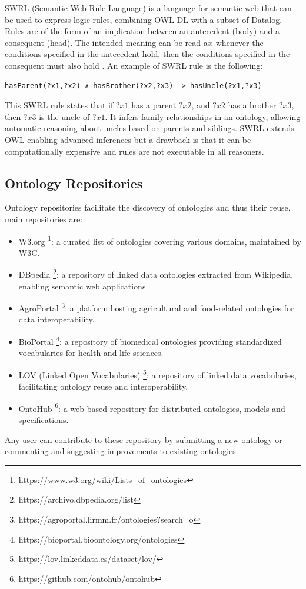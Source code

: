SWRL (Semantic Web Rule Language) is a language for semantic web that can be used to express logic rules, combining OWL DL with a subset of Datalog. Rules are of the form of an implication between an antecedent (body) and a consequent (head). The intended meaning can be read as: whenever the conditions specified in the antecedent hold, then the conditions specified in the consequent must also hold \cite{swrl_wiki}. An example of SWRL rule is the following:
\begin{lstlisting}
hasParent(?x1,?x2) ∧ hasBrother(?x2,?x3) -> hasUncle(?x1,?x3)
\end{lstlisting}
This SWRL rule states that if $?x1$ has a parent $?x2$, and $?x2$ has a brother $?x3$, then $?x3$ is the uncle of $?x1$. It infers family relationships in an ontology, allowing automatic reasoning about uncles based on parents and siblings.
SWRL extends OWL enabling advanced inferences but a drawback is that it can be computationally expensive and rules are not executable in all reasoners.

\subsection{Ontology Repositories}
Ontology repositories facilitate the discovery of ontologies and thus their reuse, main repositories are:
\begin{itemize}
    \item W3.org \footnote{https://www.w3.org/wiki/Lists\_of\_ontologies}: a curated list of ontologies covering various domains, maintained by W3C.

    \item DBpedia \footnote{https://archivo.dbpedia.org/list}: a repository of linked data ontologies extracted from Wikipedia, enabling semantic web applications.

    \item AgroPortal \footnote{https://agroportal.lirmm.fr/ontologies?search=o}: a platform hosting agricultural and food-related ontologies for data interoperability.

    \item BioPortal \footnote{https://bioportal.bioontology.org/ontologies}: a repository of biomedical ontologies providing standardized vocabularies for health and life sciences.

    \item LOV (Linked Open Vocabularies) \footnote{https://lov.linkeddata.es/dataset/lov/}: a repository of linked data vocabularies, facilitating ontology reuse and interoperability.


    \item OntoHub \footnote{https://github.com/ontohub/ontohub}: a web-based repository for distributed ontologies, models and specifications.
\end{itemize}
Any user can contribute to these repository by submitting a new ontology or commenting and suggesting improvements to existing ontologies.



